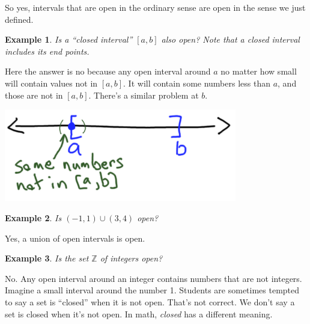 \documentclass[11pt]{book}
\newtheorem{example}{Example}
\numberwithin{example}{chapter}
\begin{document}
\begin{center}
\end{center}


So yes, intervals that are open in the ordinary sense are open in the sense we just defined.  


\begin{example}
Is a ``closed interval'' $[a,b]$ also \emph{open}?  Note that a closed interval includes its end points.

\end{example}

Here the answer is no because any open interval around $a$ no matter how small will contain values not in $[a,b]$.  It will contain some numbers less than $a$, and those are not in $[a,b]$.  There's a similar problem at $b$.  

\begin{center}
\includegraphics[width=4in]{toplec1_2.png}
\end{center}

\begin{example}
Is $(-1,1)\cup (3,4)$ open?  
\end{example}

Yes, a union of open intervals is open.

\begin{example}
Is the set $\mathbb{Z}$ of integers open?
\end{example}

No.  Any open interval around an integer contains numbers that are not integers.  Imagine a small interval around the number 1.  Students are sometimes tempted to say a set is ``closed'' when it is not open.  That's not correct.  We don't say a set is closed when it's not open.  In math, \emph{closed} has a different meaning.  
\end{document}
